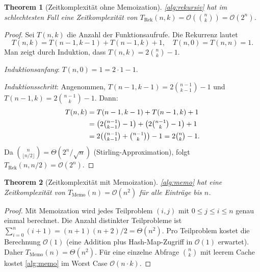 ﻿\documentclass[12pt, a4paper]{article}
\newcommand{\Oh}{\mathcal{O}}
\theoremstyle{plain}
\newtheorem{theorem}{Theorem}[section]
\theoremstyle{definition}
\theoremstyle{remark}
\renewcommand{\Oh}{\mathcal{O}}
\begin{document}
\begin{theorem}[Zeitkomplexität ohne Memoization]
  \label{thm:rekursiv_zeit}
  \cref{alg:rekursiv} hat im schlechtesten Fall eine Zeitkomplexität
  von $T_{\text{Rek}}(n, k) = \Oh\!\left(\binom{n}{k}\right) = \Oh(2^n)$.
\end{theorem}

\begin{proof}
  Sei $T(n, k)$ die Anzahl der Funktionsaufrufe. Die Rekurrenz lautet
  \begin{equation}
    T(n, k) = T(n-1, k-1) + T(n-1, k) + 1,
    \quad T(n, 0) = T(n, n) = 1.
  \end{equation}
  Man zeigt durch Induktion, dass $T(n, k) = 2\binom{n}{k} - 1$.

  \emph{Induktionsanfang}: $T(n, 0) = 1 = 2 \cdot 1 - 1$. \checkmark

  \emph{Induktionsschritt}: Angenommen, $T(n-1, k-1) = 2\binom{n-1}{k-1} - 1$
  und $T(n-1, k) = 2\binom{n-1}{k} - 1$. Dann:
  \begin{align}
    T(n, k) &= T(n-1, k-1) + T(n-1, k) + 1 \notag\\
            &= \bigl(2\tbinom{n-1}{k-1} - 1\bigr)
             + \bigl(2\tbinom{n-1}{k} - 1\bigr) + 1 \notag\\
            &= 2\bigl(\tbinom{n-1}{k-1} + \tbinom{n-1}{k}\bigr) - 1
             = 2\tbinom{n}{k} - 1.
  \end{align}
  Da $\binom{n}{\lfloor n/2 \rfloor} = \Theta(2^n / \sqrt{n})$
  (Stirling-Approximation), folgt $T_{\text{Rek}}(n, n/2) = \Oh(2^n)$.
\end{proof}

\begin{theorem}[Zeitkomplexität mit Memoization]
  \label{thm:memo_zeit}
  \cref{alg:memo} hat eine Zeitkomplexität von
  $T_{\text{Memo}}(n) = \Oh(n^2)$ für \emph{alle} Einträge bis $n$.
\end{theorem}

\begin{proof}
  Mit Memoization wird jedes Teilproblem $(i, j)$ mit
  $0 \le j \le i \le n$ genau einmal berechnet. Die Anzahl
  distinkter Teilprobleme ist $\sum_{i=0}^{n}(i+1) = (n+1)(n+2)/2 = \Theta(n^2)$.
  Pro Teilproblem kostet die Berechnung $\Oh(1)$ (eine Addition plus
  Hash-Map-Zugriff in $\Oh(1)$ erwartet). Daher $T_{\text{Memo}}(n) = \Theta(n^2)$.
  Für eine einzelne Abfrage $\binom{n}{k}$ mit leerem Cache kostet
  \cref{alg:memo} im Worst Case $\Oh(n \cdot k)$.
\end{proof}
\end{document}
